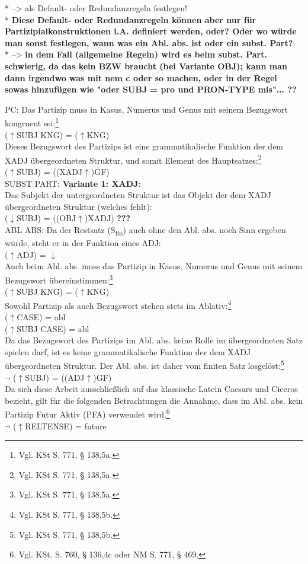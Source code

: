 \documentclass[12pt,a4paper]{article}
\begin{document}
* --> als Default- oder Redundanzregeln festlegen! \\
* \textbf{Diese Default- oder Redundanzregeln können aber nur für Partizipialkonstruktionen i.A. definiert werden, oder? Oder wo würde man sonst festlegen, wann was ein Abl. abs. ist oder ein subst. Part?} \\
* --> \textbf{in dem Fall (allgemeine Regeln) wird es beim subst. Part. schwierig, da das kein BZW braucht (bei Variante OBJ); kann man dann irgendwo was mit nem c oder so machen, oder in der Regel sowas hinzufügen wie "oder SUBJ = pro und PRON-TYPE mis"... ??}

PC:
Das Partizip muss in Kasus, Numerus und Genus mit seinem Bezugswort kongruent sei:\footnote{Vgl. KSt S. 771, § 138,5a.}\\
($\uparrow$SUBJ KNG) = ($\uparrow$KNG)\\
Dieses Bezugswort des Partizips ist eine grammatikalische Funktion der dem XADJ übergeordneten Struktur, und somit Element des Hauptsatzes:\footnote{Vgl. KSt S. 771, § 138,5a.}\\
($\uparrow$SUBJ) = ((XADJ$\uparrow$)GF) \\

SUBST PART:
\textbf{Variante 1: XADJ}:\\
Das Subjekt der untergeordneten Struktur ist das Objekt der dem XADJ übergeordneten Struktur (welches fehlt): \\
($\downarrow$SUBJ) = ((OBJ$\uparrow$)XADJ) \textbf{???} \\

ABL ABS:
Da der Restsatz (S\textsubscript{fin}) auch ohne den Abl. abs. noch Sinn ergeben würde,  steht er in der Funktion eines ADJ: \\
($\uparrow$ADJ) = $\downarrow$ \\
Auch beim Abl. abs. muss das Partizip in Kasus, Numerus und Genus mit seinem Bezugswort übereinstimmen:\footnote{Vgl. KSt S. 771, § 138,5a.}\\
($\uparrow$SUBJ KNG) = ($\uparrow$KNG)\\
Sowohl Partizip als auch Bezugswort stehen stets im Ablativ:\footnote{Vgl. KSt S. 771, § 138,5b.} \\
($\uparrow$CASE) = abl \\
($\uparrow$SUBJ CASE) = abl \\
Da das Bezugswort des Partizips im Abl. abs. keine Rolle im übergeordneten Satz spielen darf, ist es keine grammatikalische Funktion der dem XADJ übergeordneten Struktur. Der Abl. abs. ist daher vom finiten Satz losgelöst:\footnote{Vgl. KSt S. 771, § 138,5b.} \\
$\neg$ ($\uparrow$SUBJ) = ((ADJ$\uparrow$)GF) \\
Da sich diese Arbeit ausschließlich auf das klassische Latein Caesars und Ciceros bezieht, gilt für die folgenden Betrachtungen die Annahme, dass im Abl. abs. kein Partizip Futur Aktiv (PFA) verwendet wird.\footnote{Vgl. KSt. S. 760, § 136,4c oder NM S. 771, § 469.}\\
$\neg$ ($\uparrow$RELTENSE) = future \\
\end{document}
